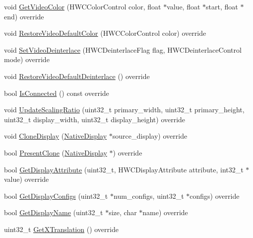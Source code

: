 \begin{DoxyCompactItemize}
void \mbox{\hyperlink{classhwcomposer_1_1MosaicDisplay_ab4b88eb3a5d9a811dada73b0f8d33c4d}{Get\+Video\+Color}} (H\+W\+C\+Color\+Control color, float $\ast$value, float $\ast$start, float $\ast$end) override
\item 
void \mbox{\hyperlink{classhwcomposer_1_1MosaicDisplay_aaf2a3e4f69753b92366c23434db3d133}{Restore\+Video\+Default\+Color}} (H\+W\+C\+Color\+Control color) override
\item 
void \mbox{\hyperlink{classhwcomposer_1_1MosaicDisplay_a28167d8f866c8b2c6ea01b42b442eb0f}{Set\+Video\+Deinterlace}} (H\+W\+C\+Deinterlace\+Flag flag, H\+W\+C\+Deinterlace\+Control mode) override
\item 
void \mbox{\hyperlink{classhwcomposer_1_1MosaicDisplay_a907f7b2e5c59a27e5335f8cfadba87f5}{Restore\+Video\+Default\+Deinterlace}} () override
\item 
bool \mbox{\hyperlink{classhwcomposer_1_1MosaicDisplay_a837d28f710438d462fd88b85721528b0}{Is\+Connected}} () const override
\item 
void \mbox{\hyperlink{classhwcomposer_1_1MosaicDisplay_aa0d5befb882537555f4476130863c27c}{Update\+Scaling\+Ratio}} (uint32\+\_\+t primary\+\_\+width, uint32\+\_\+t primary\+\_\+height, uint32\+\_\+t display\+\_\+width, uint32\+\_\+t display\+\_\+height) override
\item 
void \mbox{\hyperlink{classhwcomposer_1_1MosaicDisplay_a7944dd71d1efa68e0f94f68cc1bd30b2}{Clone\+Display}} (\mbox{\hyperlink{classhwcomposer_1_1NativeDisplay}{Native\+Display}} $\ast$source\+\_\+display) override
\item 
bool \mbox{\hyperlink{classhwcomposer_1_1MosaicDisplay_a989d240e0d3287ec2b9e6cfbe1041bda}{Present\+Clone}} (\mbox{\hyperlink{classhwcomposer_1_1NativeDisplay}{Native\+Display}} $\ast$) override
\item 
bool \mbox{\hyperlink{classhwcomposer_1_1MosaicDisplay_a7a03738eb7862a1b2e1585fbd80e710c}{Get\+Display\+Attribute}} (uint32\+\_\+t, H\+W\+C\+Display\+Attribute attribute, int32\+\_\+t $\ast$value) override
\item 
bool \mbox{\hyperlink{classhwcomposer_1_1MosaicDisplay_a18bc1bc98ff2814c710ee1202f868217}{Get\+Display\+Configs}} (uint32\+\_\+t $\ast$num\+\_\+configs, uint32\+\_\+t $\ast$configs) override
\item 
bool \mbox{\hyperlink{classhwcomposer_1_1MosaicDisplay_ac76216611bf8bebcf182a1c18b3d0c04}{Get\+Display\+Name}} (uint32\+\_\+t $\ast$size, char $\ast$name) override
\item 
uint32\+\_\+t \mbox{\hyperlink{classhwcomposer_1_1MosaicDisplay_a8f006e53e5d0e8c6caf8ac50f25ab407}{Get\+X\+Translation}} () override

\end{DoxyCompactItemize}
